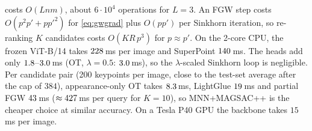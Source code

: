  costs $O(Lnm)$, about $6\cdot10^{4}$ operations for $L=3$. An FGW step costs
$O(p^2p'+pp'^2)$ for \eqref{eq:gwgrad} plus $O(pp')$ per Sinkhorn iteration, so re-ranking $K$
candidates costs $O(KR\,p^3)$ for $p\approx p'$. On the 2-core CPU, the frozen ViT-B/14 takes $228$\,ms per image and SuperPoint
$140$\,ms. The heads add only $1.8$--$3.0$\,ms (OT, $\lambda=0.5$: $3.0$\,ms), so the $\lambda$-scaled
Sinkhorn loop is negligible. Per candidate pair (200 keypoints per image, close to the test-set average after the cap of $384$), appearance-only OT takes $8.3$\,ms, LightGlue $19$\,ms and
partial FGW $43$\,ms ($\approx427$\,ms per query for $K=10$), so MNN+MAGSAC++ is the cheaper choice
at similar accuracy. On a Tesla P40 GPU the backbone takes $15$\,ms per image.
